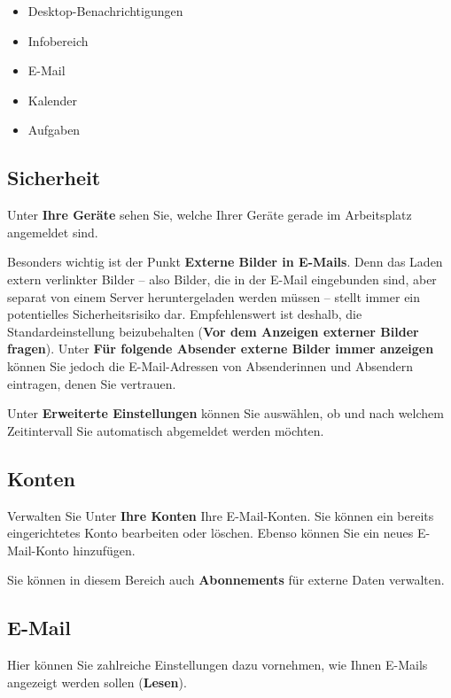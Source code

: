 \documentclass[
  letterpaper,
  DIV=11,
  numbers=noendperiod]{scrreprt}
\providecommand{\tightlist}{%
  \setlength{\itemsep}{0pt}\setlength{\parskip}{0pt}}\usepackage{longtable,booktabs,array}
\begin{document}
\begin{itemize}
\tightlist
\item
  Desktop-Benachrichtigungen
\item
  Infobereich
\item
  E-Mail
\item
  Kalender
\item
  Aufgaben
\end{itemize}

\subsection{Sicherheit}\label{sicherheit-1}

Unter \textbf{Ihre Geräte} sehen Sie, welche Ihrer Geräte gerade im
Arbeitsplatz angemeldet sind.

Besonders wichtig ist der Punkt \textbf{Externe Bilder in E-Mails}. Denn
das Laden extern verlinkter Bilder -- also Bilder, die in der E-Mail
eingebunden sind, aber separat von einem Server heruntergeladen werden
müssen -- stellt immer ein potentielles Sicherheitsrisiko dar.
Empfehlenswert ist deshalb, die Standardeinstellung beizubehalten
(\textbf{Vor dem Anzeigen externer Bilder fragen}). Unter \textbf{Für
folgende Absender externe Bilder immer anzeigen} können Sie jedoch die
E-Mail-Adressen von Absenderinnen und Absendern eintragen, denen Sie
vertrauen.

Unter \textbf{Erweiterte Einstellungen} können Sie auswählen, ob und
nach welchem Zeitintervall Sie automatisch abgemeldet werden möchten.

\subsection{Konten}\label{konten}

Verwalten Sie Unter \textbf{Ihre Konten} Ihre E-Mail-Konten. Sie können
ein bereits eingerichtetes Konto bearbeiten oder löschen. Ebenso können
Sie ein neues E-Mail-Konto hinzufügen.

Sie können in diesem Bereich auch \textbf{Abonnements} für externe Daten
verwalten.

\subsection{E-Mail}\label{e-mail-1}

Hier können Sie zahlreiche Einstellungen dazu vornehmen, wie Ihnen
E-Mails angezeigt werden sollen (\textbf{Lesen}).
\end{document}
